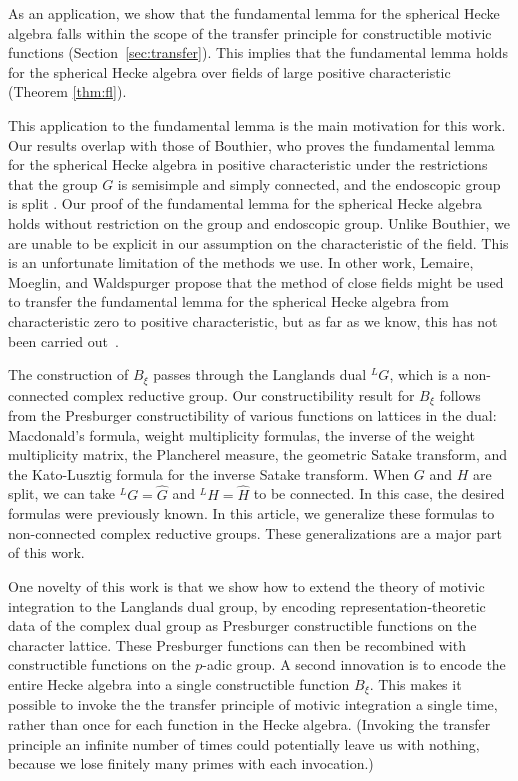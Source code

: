 As an application, we show that the fundamental lemma for the
spherical Hecke algebra falls within the scope of the transfer
principle for constructible motivic functions
(Section~\ref{sec:transfer}).  This implies that the fundamental lemma
holds for the spherical Hecke algebra over fields of large positive
characteristic (Theorem \ref{thm:fl}).

This application to the fundamental lemma is the main motivation for
this work.  Our results overlap with those of Bouthier, who proves the
fundamental lemma for the spherical Hecke algebra in positive
characteristic under the restrictions that the group $G$ is semisimple
and simply connected, and the endoscopic group is split
\cite[Theorem~0.2]{bouthier}.  Our proof of the fundamental lemma for
the spherical Hecke algebra holds without restriction on the group and
endoscopic group.  Unlike Bouthier, we are unable to be explicit in
our assumption on the characteristic of the field.  This is an
unfortunate limitation of the methods we use.  In other work, Lemaire,
Moeglin, and Waldspurger propose that the method of close fields might
be used to transfer the fundamental lemma for the spherical Hecke
algebra from characteristic zero to positive characteristic, but as
far as we know, this has not been carried out~\cite[\S1.3]{LMW}.

The construction of $B_\xi$ passes through the Langlands dual ${}^LG$,
which is a non-connected complex reductive group.  Our
constructibility result for $B_\xi$ follows from the Presburger
constructibility of various functions on lattices in the dual:
Macdonald's formula, weight multiplicity formulas, the inverse of the
weight multiplicity matrix, the Plancherel measure, the geometric
Satake transform, and the Kato-Lusztig formula for the inverse Satake
transform.  When $G$ and $H$ are split, we can take ${}^LG = \hat G$
and ${}^LH=\hat H$ to be connected.  In this case, the desired
formulas were previously known.  In this article, we generalize these
formulas to non-connected complex reductive groups.  These
generalizations are a major part of this work.

One novelty of this work is that we show how to extend the theory of
motivic integration to the Langlands dual group, by encoding
representation-theoretic data of the complex dual group as Presburger
constructible functions on the character lattice. These Presburger
functions can then be recombined with constructible functions on the
$p$-adic group.  A second innovation is to encode the entire Hecke
algebra into a single constructible function $B_\xi$.  This makes it
possible to invoke the the transfer principle of motivic integration a
single time, rather than once for each function in the Hecke algebra.
(Invoking the transfer principle an infinite number of times could
potentially leave us with nothing, because we lose finitely many
primes with each invocation.)

